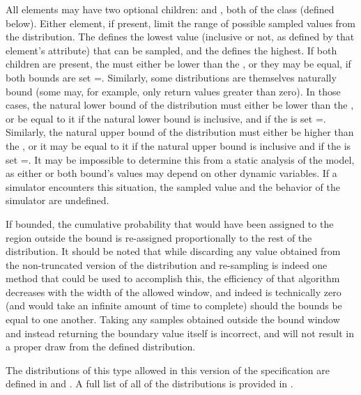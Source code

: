 All \ContinuousUnivariateDistribution elements may have two optional children:  and , both of the class \UncertBound (defined below).  Either element, if present, limit the range of possible sampled values from the distribution.  The  defines the lowest value (inclusive or not, as defined by that element's  attribute) that can be sampled, and the  defines the highest.  If both children are present, the  must either be lower than the , or they may be equal, if both bounds are set =.  Similarly, some distributions are themselves naturally bound (some may, for example, only return values greater than zero).  In those cases, the natural lower bound of the distribution must either be lower than the , or be equal to it if the natural lower bound is inclusive, and if the  is set =.  Similarly, the natural upper bound of the distribution must either be higher than the , or it may be equal to it if the natural upper bound is inclusive and if the  is set =.  It may be impossible to determine this from a static analysis of the model, as either or both bound's values may depend on other dynamic variables.  If a simulator encounters this situation, the sampled value and the behavior of the simulator are undefined.

If bounded, the cumulative probability that would have been assigned to the region outside the bound is re-assigned proportionally to the rest of the distribution.  It should be noted that while discarding any value obtained from the non-truncated version of the distribution and re-sampling is indeed one method that could be used to accomplish this, the efficiency of that algorithm decreases with the width of the allowed window, and indeed is technically zero (and would take an infinite amount of time to complete) should the bounds be equal to one another.  Taking any samples obtained outside the bound window and instead returning the boundary value itself is incorrect, and will not result in a proper draw from the defined distribution.

The distributions of this type allowed in this version of the specification are defined in  and .  A full list of all of the distributions is provided in .


